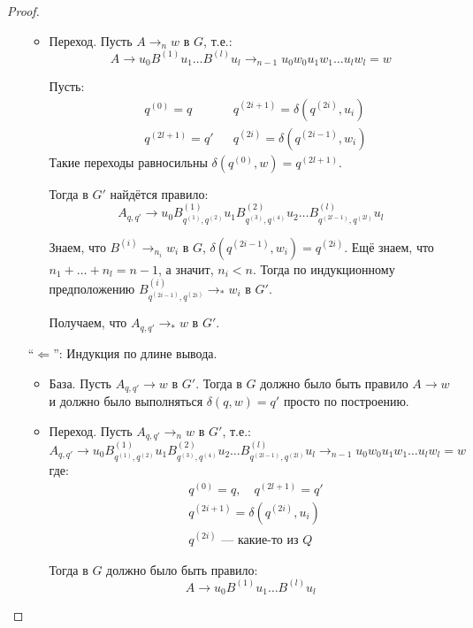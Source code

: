\begin{proof}
\begin{itemize}
\begin{itemize}
            \item Переход. Пусть $A \to_n w$ в $G$, т.е.:
            $$ A \to u_0 B^{(1)} u_1 \dots B^{(l)} u_l \to_{n-1} u_0 w_0 u_1 w_1 \dots u_l w_l = w$$

            Пусть:
            \begin{align*}
                & q^{(0)} = q 
                && q^{(2i + 1)} = \delta(q^{(2i)}, u_i) \\
                & q^{(2l + 1)} = q'
                && q^{(2i)} = \delta(q^{(2i - 1)}, w_i)
            \end{align*}
            Такие переходы равносильны $\delta(q^{(0)}, w) = q^{(2l+1)}$.

            Тогда в $G'$ найдётся правило:
            $$ A_{q, q'} \to u_0 B^{(1)}_{q^{(1)}, q^{(2)}} u_1 B^{(2)}_{q^{(3)}, q^{(4)}} u_2 \dots B^{{(l)}}_{q^{(2l - 1)}, q^{(2l)}} u_l $$

            Знаем, что $B^{(i)} \to_{n_i} w_i$ в $G$, $\delta(q^{(2i-1)}, w_i) = q^{(2i)}$. Ещё знаем, что $n_1 + \dots + n_l = n - 1$, а значит, $n_i < n$. Тогда по индукционному предположению $B^{(i)}_{q^{(2i-1)}, q^{(2i)}} \to_* w_i$ в $G'$.

            Получаем, что $A_{q, q'} \to_* w$ в $G'$.
        \end{itemize} 

        \item[``$\Longleftarrow$'':] Индукция по длине вывода.
        \begin{itemize}
            \item База. Пусть $A_{q,q'} \to w$ в $G'$.
            Тогда в $G$ должно было быть правило $A \to w$ и должно было выполняться $\delta(q, w) = q'$ просто по построению.

            \item Переход. Пусть $A_{q,q'} \to_n w$ в $G'$, т.е.:
            $$ A_{q, q'} \to u_0 B^{(1)}_{q^{(1)}, q^{(2)}} u_1 B^{(2)}_{q^{(3)}, q^{(4)}} u_2 \dots B^{{(l)}}_{q^{(2l - 1)}, q^{(2l)}} u_l \to_{n-1} u_0 w_0 u_1 w_1 \dots u_l w_l = w$$
            где:
            \begin{align*}
                & q^{(0)} = q, \quad q^{(2l + 1)} = q' \\
                & q^{(2i + 1)} = \delta(q^{(2i)}, u_i) \\
                & q^{(2i)} \text{ --- какие-то из $Q$ }
            \end{align*}

            Тогда в $G$ должно было быть правило: 
            $$A \to u_0 B^{(1)} u_1 \dots B^{(l)} u_l$$


\end{itemize}
\end{itemize}
\end{proof}
